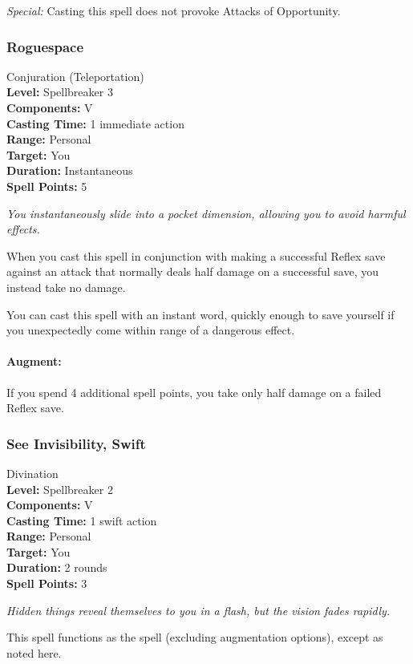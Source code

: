 \emph{Special:} Casting this spell does not provoke Attacks of Opportunity.
\subsubsection{Roguespace}
\label{Spell:Roguespace}
Conjuration (Teleportation)
\\ \textbf{Level:} Spellbreaker 3
\\ \textbf{Components:} V
\\ \textbf{Casting Time:} 1 immediate action
\\ \textbf{Range:} Personal
\\ \textbf{Target:} You
\\ \textbf{Duration:} Instantaneous
\\ \textbf{Spell Points:} 5

\emph{You instantaneously slide into a pocket dimension, allowing you to avoid harmful effects.}

When you cast this spell in conjunction with making a successful Reflex save against an attack that normally deals half damage on a successful save, you instead take no damage.

You can cast this spell with an instant word, quickly enough to save yourself if you unexpectedly come within range of a dangerous effect.

\paragraph{Augment:} If you spend 4 additional spell points, you take only half damage on a failed Reflex save.
\subsubsection[Swift See Invisibility]{See Invisibility, Swift}
\label{Spell:SwiftSeeInvisibility}
Divination
\\ \textbf{Level:} Spellbreaker 2
\\ \textbf{Components:} V
\\ \textbf{Casting Time:} 1 swift action
\\ \textbf{Range:} Personal
\\ \textbf{Target:} You
\\ \textbf{Duration:} 2 rounds
\\ \textbf{Spell Points:} 3

\emph{Hidden things reveal themselves to you in a flash, but the vision fades rapidly.}

This spell functions as the  spell (excluding augmentation options), except as noted here.


